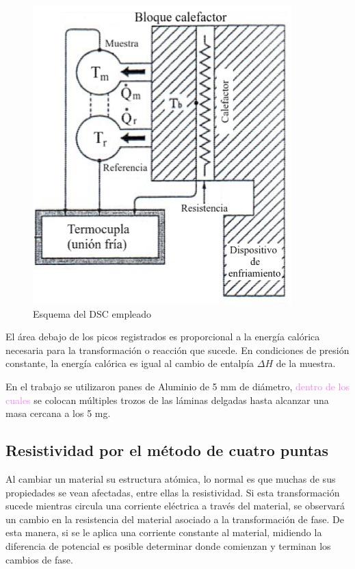\documentclass[12pt]{article}
\theoremstyle{definition}
\theoremstyle{remark}
\begin{document}
{\begin{figure}[h]
	\centering
	\includegraphics[scale=0.5]{img/DSCscheme.png}
	\caption{Esquema del DSC empleado}
	\label{DSCscheme}
\end{figure}

El área debajo de los picos registrados es proporcional a la energía calórica necesaria para la transformación o reacción que sucede. En condiciones de presión constante, la energía calórica es igual al cambio de entalpía $\Delta H$ de la muestra.

En el trabajo se utilizaron panes de Aluminio de 5 mm de diámetro, \textcolor{violet}{dentro de los cuales} se colocan múltiples trozos de las láminas delgadas hasta alcanzar una masa cercana a los 5 mg.


\subsection{Resistividad por el método de cuatro puntas}


Al cambiar un material su estructura atómica, lo normal es que muchas de sus propiedades se vean afectadas, entre ellas la resistividad. Si esta transformación sucede mientras circula una corriente eléctrica a través del material, se observará un cambio en la resistencia del material asociado a la transformación de fase. De esta manera, si se le aplica una corriente constante al material, midiendo la diferencia de potencial es posible determinar donde comienzan y terminan los cambios de fase.


}
\end{document}
